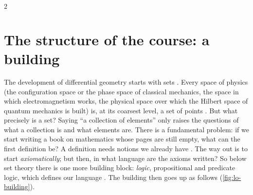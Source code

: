 \begin{paracol}{2}
\begin{nfigure}
\caption{Where the physical theories sit among the three mathematical fields . The course is
about the centre.}\label{fig:lo-venn}
\end{nfigure}

\section{The structure of the course: a building}\label{sec:lo-structure}

The development of differential geometry starts with sets . Every space of physics (the
configuration space or the phase space of classical mechanics, the space in which electromagnetism works, the
physical space over which the Hilbert space of quantum mechanics is built) is, at its coarsest level, a set of
points . But what precisely is a set? Saying ``a collection of elements'' only raises the
questions of what a collection is and what elements are. There is a fundamental problem: if we start writing a
book on mathematics whose pages are still empty, what can the first definition be? A definition needs notions
we already have . The way out is to start \emph{axiomatically}; but then, in what language are
the axioms written? So below set theory there is one more building block: \emph{logic}, propositional and
predicate logic, which defines our language . The building then goes up as follows
(\cref{fig:lo-building}).


\end{paracol}
